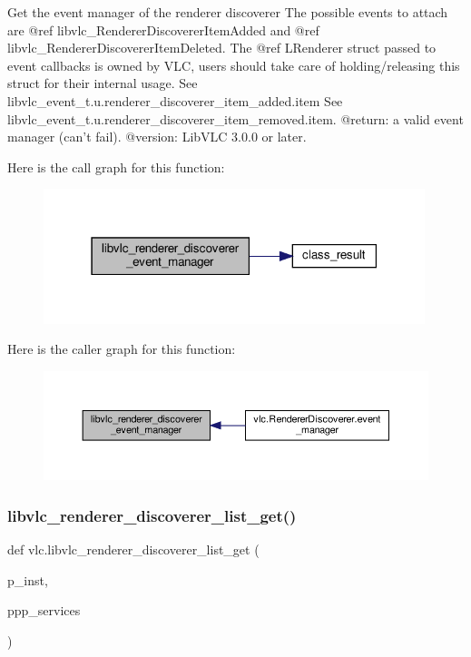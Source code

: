 \begin{DoxyVerb}Get the event manager of the renderer discoverer
The possible events to attach are @ref libvlc_RendererDiscovererItemAdded
and @ref libvlc_RendererDiscovererItemDeleted.
The @ref L{Renderer} struct passed to event callbacks is owned by
VLC, users should take care of holding/releasing this struct for their
internal usage.
See libvlc_event_t.u.renderer_discoverer_item_added.item
See libvlc_event_t.u.renderer_discoverer_item_removed.item.
@return: a valid event manager (can't fail).
@version: LibVLC 3.0.0 or later.
\end{DoxyVerb}
 Here is the call graph for this function\+:
\nopagebreak
\begin{figure}[H]
\begin{center}
\leavevmode
\includegraphics[width=315pt]{namespacevlc_a1ea941d7c32dbab6a943838c3d2dda32_cgraph}
\end{center}
\end{figure}
Here is the caller graph for this function\+:
\nopagebreak
\begin{figure}[H]
\begin{center}
\leavevmode
\includegraphics[width=350pt]{namespacevlc_a1ea941d7c32dbab6a943838c3d2dda32_icgraph}
\end{center}
\end{figure}
\mbox{\label{namespacevlc_af59f382bb827e83d0dfa826e209d12ef}} 
\subsubsection{\texorpdfstring{libvlc\+\_\+renderer\+\_\+discoverer\+\_\+list\+\_\+get()}{libvlc\_renderer\_discoverer\_list\_get()}}
{\footnotesize\ttfamily def vlc.\+libvlc\+\_\+renderer\+\_\+discoverer\+\_\+list\+\_\+get (\begin{DoxyParamCaption}\item[{}]{p\+\_\+inst,  }\item[{}]{ppp\+\_\+services }\end{DoxyParamCaption})}

